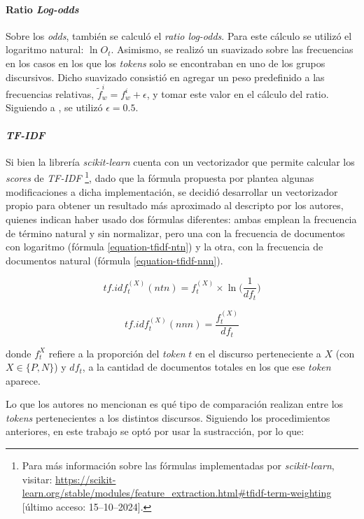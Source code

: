 \paragraph{Ratio \textit{Log-odds}}
Sobre los \textit{odds}, tambi\'en se calcul\'o el \textit{ratio log-odds}.
Para este c\'alculo se utiliz\'o el logaritmo natural: $\ln{O_t}$.
Asimismo, se realiz\'o un suavizado sobre las frecuencias en los casos
en los que los \textit{tokens} solo se encontraban en uno de los grupos
discursivos. Dicho suavizado consisti\'o en agregar un peso predefinido a las
frecuencias relativas, $\tilde{f}^{i}_{w} = f^{i}_{w}+\epsilon$, y tomar
este valor en el c\'alculo del ratio. Siguiendo a \cite{monroe2008fightin},
se utiliz\'o $\epsilon=0.5$.

\paragraph{\textit{TF-IDF}}
\label{paragraph-methods-tfidf}
Si bien la librer\'ia \textit{scikit-learn} cuenta con un vectorizador
que permite calcular los \textit{scores} de \textit{TF-IDF}
\footnote{Para m\'as informaci\'on sobre las f\'ormulas
implementadas por \textit{scikit-learn}, visitar:
\url{https://scikit-learn.org/stable/modules/feature_extraction.html\#tfidf-term-weighting} [\'ultimo acceso: 15--10--2024].},
dado que la f\'ormula propuesta por  plantea
algunas modificaciones a dicha implementaci\'on, se decidi\'o
desarrollar un vectorizador propio para obtener un resultado
m\'as aproximado al descripto por los autores, quienes indican haber usado
dos f\'ormulas diferentes: ambas emplean la frecuencia
de t\'ermino natural y sin normalizar, pero una con la frecuencia de documentos
con logaritmo (f\'ormula \ref{equation-tfidf-ntn}) y la otra, con la frecuencia
de documentos natural (f\'ormula \ref{equation-tfidf-nnn}).

\begin{equation}
\label{equation-tfidf-ntn}
    tf.idf_{t}^{(X)}(ntn) = f_{t}^{(X)} \times \ln\bigg({\frac{1}{df_{t}}}\bigg)
\end{equation}

\begin{equation}
\label{equation-tfidf-nnn}
    tf.idf_{t}^{(X)}(nnn) = \frac{f_{t}^{(X)}}{df_{t}}
\end{equation}

donde $f_{t}^{X}$ refiere a la proporci\'on del \textit{token} $t$
en el discurso perteneciente a $X$
(con $X \in \lbrace P,N \rbrace$) y $df_t$, a la cantidad
de documentos totales en los que ese \textit{token} aparece.
\par
Lo que los autores no mencionan es qu\'e tipo de comparaci\'on realizan
entre los \textit{tokens} pertenecientes a los distintos discursos.
Siguiendo los procedimientos anteriores, en este trabajo se opt\'o por usar
la sustracci\'on, por lo que:

